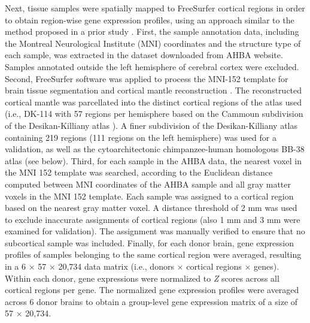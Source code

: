 \begin{refsection}
Next, tissue samples were spatially mapped to FreeSurfer cortical regions in order to obtain region-wise gene expression profiles, using an approach similar to the method proposed in a prior study \citep{French2015AFV}. First, the sample annotation data, including the Montreal Neurological Institute (MNI) coordinates and the structure type of each sample, was extracted in the dataset downloaded from AHBA website. Samples annotated outside the left hemisphere of cerebral cortex were excluded. Second, FreeSurfer software was applied to process the MNI-152 template for brain tissue segmentation and cortical mantle reconstruction \citep{Fischl2004parcellation}. The reconstructed cortical mantle was parcellated into the distinct cortical regions of the atlas used (i.e., DK-114 with 57 regions per hemisphere based on the Cammoun subdivision of the Desikan-Killiany atlas \citep{Fischl2004parcellation,DESIKAN2006968,CAMMOUN2012386}). A finer subdivision of the Desikan-Killiany atlas containing 219 regions (111 regions on the left hemisphere) was used for a validation, as well as the cytoarchitectonic chimpanzee-human homologous BB-38 atlas (see below). Third, for each sample in the AHBA data, the nearest voxel in the MNI 152 template was searched, according to the Euclidean distance computed between MNI coordinates of the AHBA sample and all gray matter voxels in the MNI 152 template. Each sample was assigned to a cortical region based on the nearest gray matter voxel. A distance threshold of 2 mm was used to exclude inaccurate assignments of cortical regions (also 1 mm and 3 mm were examined for validation). The assignment was manually verified to ensure that no subcortical sample was included. Finally, for each donor brain, gene expression profiles of samples belonging to the same cortical region were averaged, resulting in a 6 $ \times $  57 $ \times $  20,734 data matrix (i.e., donors $ \times $  cortical regions $ \times $  genes). Within each donor, gene expressions were normalized to \textit{Z} scores across all cortical regions per gene. The normalized gene expression profiles were averaged across 6 donor brains to obtain a group-level gene expression matrix of a size of 57 $ \times $  20,734.


\end{refsection}

